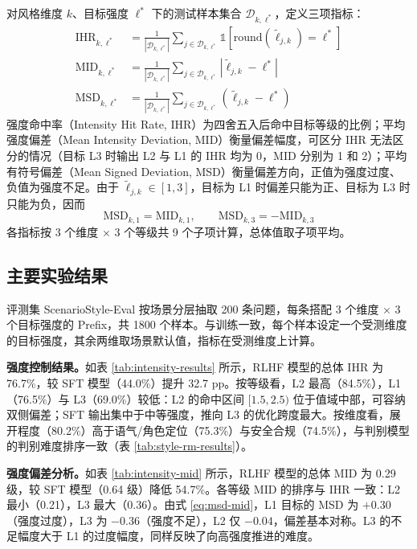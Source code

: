 \documentclass[fontset=fandol,type=master,campus=shenzhen,etitleauto=true]{hithesisbook}
\begin{document}
对风格维度 $k$、目标强度 $\ell^*$ 下的测试样本集合 $\mathcal{D}_{k,\ell^*}$，定义三项指标：
\begin{equation}
\begin{aligned}
\text{IHR}_{k,\ell^*} &= \frac{1}{|\mathcal{D}_{k,\ell^*}|} \sum_{j \in \mathcal{D}_{k,\ell^*}} \mathbb{1}\!\left[\text{round}(\tilde{\ell}_{j,k}) = \ell^*\right] \\
\text{MID}_{k,\ell^*} &= \frac{1}{|\mathcal{D}_{k,\ell^*}|} \sum_{j \in \mathcal{D}_{k,\ell^*}} \left|\tilde{\ell}_{j,k} - \ell^*\right| \\
\text{MSD}_{k,\ell^*} &= \frac{1}{|\mathcal{D}_{k,\ell^*}|} \sum_{j \in \mathcal{D}_{k,\ell^*}} \left(\tilde{\ell}_{j,k} - \ell^*\right)
\end{aligned}
\end{equation}
强度命中率（Intensity Hit Rate, IHR）为四舍五入后命中目标等级的比例；平均强度偏差（Mean Intensity Deviation, MID）衡量偏差幅度，可区分 IHR 无法区分的情况（目标 L3 时输出 L2 与 L1 的 IHR 均为 0，MID 分别为 1 和 2）；平均有符号偏差（Mean Signed Deviation, MSD）衡量偏差方向，正值为强度过度、负值为强度不足。由于 $\tilde{\ell}_{j,k} \in [1, 3]$，目标为 L1 时偏差只能为正、目标为 L3 时只能为负，因而
\begin{equation}\label{eq:msd-mid}
\text{MSD}_{k,1} = \text{MID}_{k,1}, \qquad \text{MSD}_{k,3} = -\text{MID}_{k,3}
\end{equation}
各指标按 3 个维度 × 3 个等级共 9 个子项计算，总体值取子项平均。

\subsection{主要实验结果}\label{ux4e3bux8981ux7ed3ux679c-1}

评测集 ScenarioStyle-Eval 按场景分层抽取 200 条问题，每条搭配 3 个维度 × 3 个目标强度的 Prefix，共 1800 个样本。与训练一致，每个样本设定一个受测维度的目标强度，其余两维取场景默认值，指标在受测维度上计算。

\textbf{强度控制结果。}如表 \ref{tab:intensity-results} 所示，RLHF 模型的总体 IHR 为 76.7\%，较 SFT 模型（44.0\%）提升 32.7 pp。按等级看，L2 最高（84.5\%），L1（76.5\%）与 L3（69.0\%）较低：L2 的命中区间 $[1.5, 2.5)$ 位于值域中部，可容纳双侧偏差；SFT 输出集中于中等强度，推向 L3 的优化跨度最大。按维度看，展开程度（80.2\%）高于语气/角色定位（75.3\%）与安全合规（74.5\%），与判别模型的判别难度排序一致（表 \ref{tab:style-rm-results}）。

\textbf{强度偏差分析。}如表 \ref{tab:intensity-mid} 所示，RLHF 模型的总体 MID 为 0.29 级，较 SFT 模型（0.64 级）降低 54.7\%。各等级 MID 的排序与 IHR 一致：L2 最小（0.21），L3 最大（0.36）。由式 \eqref{eq:msd-mid}，L1 目标的 MSD 为 $+0.30$（强度过度），L3 为 $-0.36$（强度不足），L2 仅 $-0.04$，偏差基本对称。L3 的不足幅度大于 L1 的过度幅度，同样反映了向高强度推进的难度。
\end{document}
